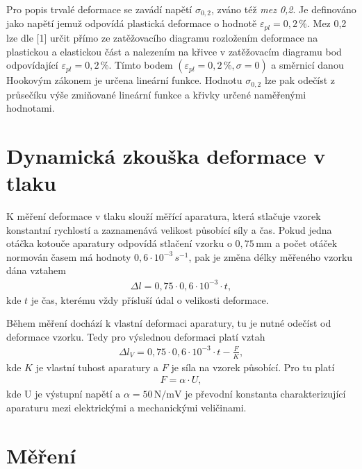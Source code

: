 \documentclass[a4paper,12pt]{article}
\begin{document}
Pro popis trvalé deformace se zavádí napětí $\sigma_{0,2}$, zváno též \textit{mez 0,2}. 
Je definováno jako napětí jemuž odpovídá plastická deformace o hodnotě 
$\varepsilon_{pl} = 0,2 \, \%$. Mez 0,2 lze dle [1] určit přímo ze zatěžovacího 
diagramu rozložením deformace na plastickou a elastickou část a nalezením 
na křivce v zatěžovacím diagramu bod odpovídající $\varepsilon_{pl} = 0,2 \, \%$. 
Tímto bodem $(\varepsilon_{pl} = 0,2 \, \%, \sigma = 0)$ a směrnicí danou 
Hookovým zákonem je určena lineární funkce. Hodnotu $\sigma_{0,2}$ lze 
pak odečíst z průsečíku výše zmiňované lineární funkce a  křivky  určené 
naměřenými hodnotami.

\section{Dynamická zkouška deformace v tlaku}
K měření deformace v tlaku slouží měřící aparatura, která stlačuje vzorek 
konstantní rychlostí a zaznamenává velikost působící síly a čas.
Pokud jedna otáčka kotouče aparatury odpovídá stlačení vzorku o $0,75 \, \mathrm{mm}$
a počet otáček normován časem má hodnoty $0,6 \cdot 10^{-3} \, s^{-1}$, pak je 
změna délky měřeného vzorku dána vztahem
\begin{eqnarray}
 \Delta l = 0,75 \cdot 0,6 \cdot 10^{-3} \cdot t, \label{dlprepocet}
\end{eqnarray}
kde $t$ je čas, kterému vždy přísluší údal o velikosti deformace. 

Během měření dochází k vlastní deformaci aparatury, tu je nutné odečíst 
od deformace vzorku. Tedy pro výslednou deformaci platí vztah
\begin{eqnarray}
\Delta l_V = 0,75 \cdot 0,6 \cdot 10^{-3} \cdot t - \frac{F}{K}, \label{dlfinal}
\end{eqnarray}
kde $K$ je vlastní tuhost aparatury a $F$ je síla na vzorek působící.
Pro tu platí
\begin{eqnarray}
F = \alpha \cdot U, \label{zUdoF}
\end{eqnarray}
kde U je výstupní napětí a $\alpha = 50 \, \mathrm{N/mV}$ je převodní 
konstanta charakterizující aparaturu mezi elektrickými a mechanickými veličinami.


\section{Měření}
\end{document}
